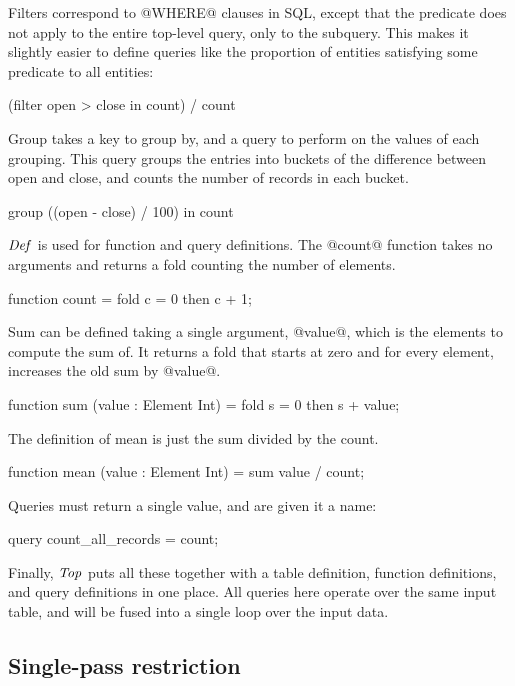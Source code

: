 Filters correspond to @WHERE@ clauses in SQL, except that the predicate does not apply to the entire top-level query, only to the subquery.
This makes it slightly easier to define queries like the proportion of entities satisfying some predicate to all entities: 
\begin{code}
(filter open > close in count) / count
\end{code}

Group takes a key to group by, and a query to perform on the values of each grouping.
This query groups the entries into buckets of the difference between open and close, and counts the number of records in each bucket.
\begin{code}
group ((open - close) / 100) in count
\end{code}

$\mathit{Def}$ is used for function and query definitions.
The @count@ function takes no arguments and returns a fold counting the number of elements.
\begin{code}
function count
 = fold c = 0 then c + 1;
\end{code}

Sum can be defined taking a single argument, @value@, which is the elements to compute the sum of.
It returns a fold that starts at zero and for every element, increases the old sum by @value@.
\begin{code}
function sum (value : Element Int)
 = fold s = 0 then s + value;
\end{code}

The definition of mean is just the sum divided by the count.
\begin{code}
function mean (value : Element Int)
 = sum value / count;
\end{code}

Queries must return a single value, and are given it a name:
\begin{code}
query count_all_records = count;
\end{code}

Finally, $\mathit{Top}$ puts all these together with a table definition, function definitions, and query definitions in one place.
All queries here operate over the same input table, and will be fused into a single loop over the input data.



\subsection{Single-pass restriction}

